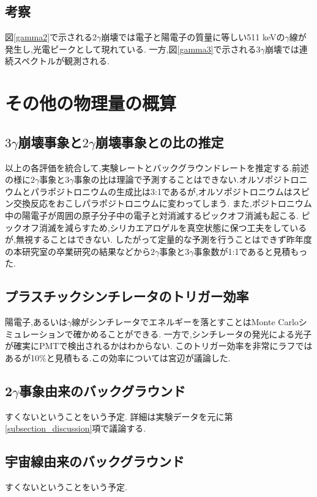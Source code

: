 \subsection{考察}
図\ref{gamma2}で示される2$\gamma$崩壊では電子と陽電子の質量に等しい511 keVの$\gamma$線が発生し,光電ピークとして現れている.
一方,図\ref{gamma3}で示される$3\gamma$崩壊では連続スペクトルが観測される.


\section{その他の物理量の概算}
\label{section_other}

\subsection{$3\gamma$崩壊事象と$2\gamma$崩壊事象との比の推定}
以上の各評価を統合して,実験レートとバックグラウンドレートを推定する.前述の様に$2\gamma$事象と$3\gamma$事象の比は理論で予測することはできない.オルソポジトロニウムとパラポジトロニウムの生成比は3:1であるが,オルソポジトロニウムはスピン交換反応をおこしパラポジトロニウムに変わってしまう.
また,ポジトロニウム中の陽電子が周囲の原子分子中の電子と対消滅するピックオフ消滅も起こる.
ピックオフ消滅を減らすため,シリカエアロゲルを真空状態に保つ工夫をしているが,無視することはできない.
したがって定量的な予測を行うことはできず昨年度の本研究室の卒業研究の結果などから$2\gamma$事象と$3\gamma$事象数が1:1であると見積もった.

\subsection{プラスチックシンチレータのトリガー効率}
陽電子,あるいは$\gamma$線がシンチレータでエネルギーを落とすことはMonte Carloシミュレーションで確かめることができる.
一方で,シンチレータの発光による光子が確実にPMTで検出されるかはわからない.
このトリガー効率を非常にラフではあるが10\%と見積もる.この効率については宮辺が議論した.

\subsection{2$\gamma$事象由来のバックグラウンド}
すくないということをいう予定.
詳細は実験データを元に第\ref{subsection_discussion}項で議論する.

\subsection{宇宙線由来のバックグラウンド}
すくないということをいう予定.


